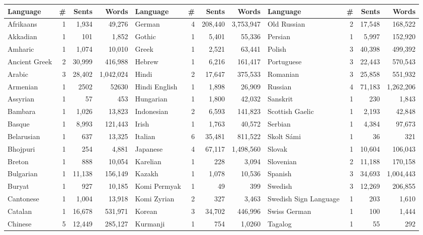 \begin{table}[t]{}
    \centering
\begin{adjustbox}{center,scale=0.85}
\footnotesize
\renewcommand{\tabcolsep}{3pt}
    \begin{tabular}{|lrrr|lrrr|lrrr|}
    \hline
    \textbf{Language}  & \textbf{\#} & \textbf{Sents} & \textbf{Words} & \textbf{Language}  & \textbf{\#} & \textbf{Sents} & \textbf{Words} & \textbf{Language}  & \textbf{\#} & \textbf{Sents} & \textbf{Words} \\
    \hline
Afrikaans &1 &1,934 &49,276 &German &4 &208,440 &3,753,947 &Old Russian &2 &17,548 &168,522 \\
Akkadian &1 &101 &1,852 &Gothic &1 &5,401 &55,336 &Persian &1 &5,997 &152,920 \\
Amharic &1 &1,074 &10,010 &Greek &1 &2,521 &63,441 &Polish &3 &40,398 &499,392 \\
Ancient Greek &2 &30,999 &416,988 &Hebrew &1 &6,216 &161,417 &Portuguese &3 &22,443 &570,543 \\
Arabic &3 &28,402 &1,042,024 &Hindi &2 &17,647 &375,533 &Romanian &3 &25,858 &551,932 \\
Armenian &1 &2502 &52630 &Hindi English &1 &1,898 &26,909 &Russian &4 &71,183 &1,262,206 \\
Assyrian &1 &57 &453 &Hungarian &1 &1,800 &42,032 &Sanskrit &1 &230 &1,843 \\
Bambara &1 &1,026 &13,823 &Indonesian &2 &6,593 &141,823 &Scottish Gaelic &1 &2,193 &42,848 \\
Basque &1 &8,993 &121,443 &Irish &1 &1,763 &40,572 &Serbian &1 &4,384 &97,673 \\
Belarusian &1 &637 &13,325 &Italian &6 &35,481 &811,522 &Skolt S\'ami &1 &36 &321 \\
Bhojpuri &1 &254 &4,881 &Japanese &4 &67,117 &1,498,560 &Slovak &1 &10,604 &106,043 \\
Breton &1 &888 &10,054 &Karelian &1 &228 &3,094 &Slovenian &2 &11,188 &170,158 \\
Bulgarian &1 &11,138 &156,149 &Kazakh &1 &1,078 &10,536 &Spanish &3 &34,693 &1,004,443 \\
Buryat &1 &927 &10,185 &Komi Permyak &1 &49 &399 &Swedish &3 &12,269 &206,855 \\
Cantonese &1 &1,004 &13,918 &Komi Zyrian &2 &327 &3,463 &Swedish Sign Language &1 &203 &1,610 \\
Catalan &1 &16,678 &531,971 &Korean &3 &34,702 &446,996 &Swiss German &1 &100 &1,444 \\
Chinese &5 &12,449 &285,127 &Kurmanji &1 &754 &1,0260 &Tagalog &1 &55 &292 \\

\end{tabular}
\end{adjustbox}
\end{table}
